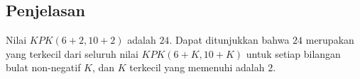 \documentclass{article}
\begin{document}
\subsection*{Penjelasan}
Nilai $KPK(6 + 2, 10 + 2)$ adalah $24$. Dapat ditunjukkan bahwa $24$ merupakan yang terkecil dari seluruh nilai $KPK(6 + K, 10 + K)$ untuk setiap bilangan bulat non-negatif $K$, dan $K$ terkecil yang memenuhi adalah $2$.

\pagebreak
\end{document}
